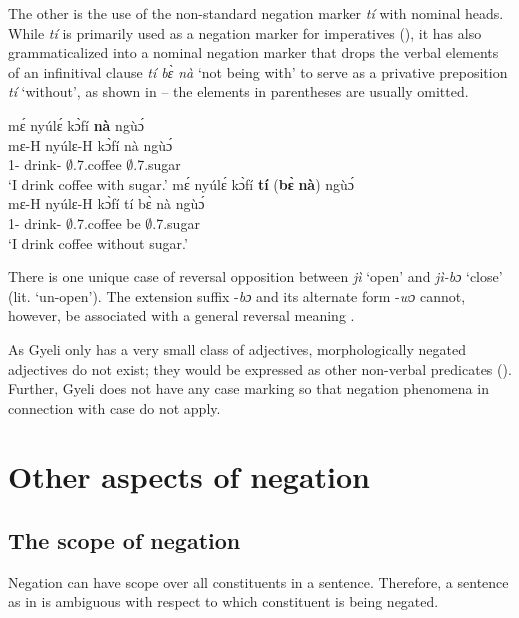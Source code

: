 \documentclass[output=paper,colorlinks=true, citecolor=brown,draftmode]{langscibook}
\begin{document}
The other is the use of the non-standard negation marker {\itshape tí}  with nominal heads. While {\itshape tí} is primarily used as a negation marker for imperatives (), it has also grammaticalized into a nominal negation marker that drops the verbal elements of an infinitival clause {\itshape tí bɛ̀ nà} `not being with' to serve as a privative preposition {\itshape tí} `without', as shown in  -- the elements in parentheses are usually omitted.

\ea\label{NEGwo1} 
\ea\label{NEGwo1a} 
  \glll  mɛ́ nyúlɛ́ kɔ̀fí {\bfseries nà} ngùɔ́ \\
            mɛ-H nyúlɛ-H kɔ̀fí nà ngùɔ́ \\
         1{\SG}-{\PRS} drink-{\R} $\emptyset$.7.coffee {\COM} $\emptyset$.7.sugar \\
    \trans `I drink coffee with sugar.'
\ex\label{NEGwo1b} 
  \glll  mɛ́ nyúlɛ́ kɔ̀fí {\bfseries tí} ({\bfseries bɛ̀} {\bfseries nà}) ngùɔ́ \\
            mɛ-H nyúlɛ-H kɔ̀fí tí bɛ̀ nà ngùɔ́ \\
         1{\SG}-{\PRS} drink-{\R} $\emptyset$.7.coffee {\NEG} be {\COM} $\emptyset$.7.sugar \\
    \trans `I drink coffee without sugar.'
\z
\z

There is one unique case of reversal opposition between {\itshape jì} `open' and {\itshape jì-bɔ} `close' (lit. `un-open'). The extension suffix -{\itshape bɔ} and its alternate form -{\itshape wɔ} cannot, however, be associated with a general reversal meaning \citep[279]{Grimm2021}.

As Gyeli only has a very small class of adjectives, morphologically negated adjectives do not exist; they would be expressed as other non-verbal predicates ().
Further, Gyeli does not have any case marking so that negation phenomena in connection with case do not apply. 

\section{Other aspects of negation}
\label{sec:gye:4}

\subsection{The scope of negation}
\label{sec:gye:Scope}

Negation can have scope over all constituents in a sentence. Therefore, a sentence as in  is ambiguous with respect to which constituent is being negated.
\end{document}
